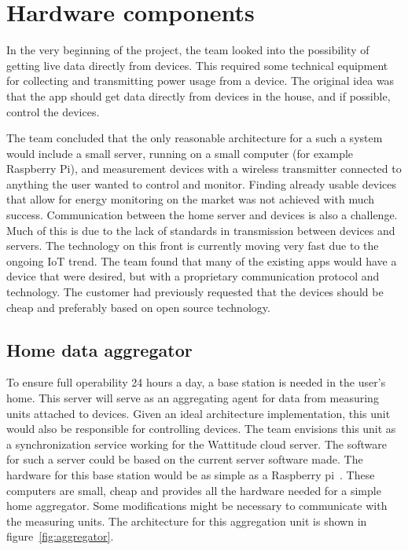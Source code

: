 \section{Hardware components}
\label{sec:hardwareComponents}
In the very beginning of the project, the team looked into the possibility of getting live data directly from devices. This required some technical equipment for collecting and transmitting power usage from a device. The original idea was that the app should get data directly from devices in the house, and if possible, control the devices.

The team concluded that the only reasonable architecture for a such a system would include a small server, running on a small computer (for example Raspberry Pi), and measurement devices with a wireless transmitter connected to anything the user wanted to control and monitor. Finding already usable devices that allow for energy monitoring on the market was not achieved with much success. Communication between the home server and devices is also a challenge. Much of this is due to the lack of standards in transmission between devices and servers. The technology on this front is currently moving very fast due to the ongoing \gls{IoT} trend. The team found that many of the existing apps would have a device that were desired, but with a proprietary communication protocol and technology. The customer had previously requested that the devices should be cheap and preferably based on open source technology.

\subsection{Home data aggregator}
To ensure full operability 24 hours a day, a base station is needed in the user's home. This server will serve as an aggregating agent for data from measuring units attached to devices. Given an ideal architecture implementation, this unit would also be responsible for controlling devices. The team envisions this unit as a synchronization service working for the Wattitude cloud server. The software for such a server could be based on the current server software made. The hardware for this base station would be as simple as a Raspberry pi~\cite{pi}. These computers are small, cheap and provides all the hardware needed for a simple home aggregator. Some modifications might be necessary to communicate with the measuring units. The architecture for this aggregation unit is shown in figure~\ref{fig:aggregator}.

